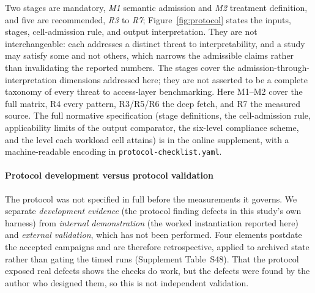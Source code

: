Two stages are mandatory, \emph{M1} semantic admission and \emph{M2} treatment definition, and five are recommended, \emph{R3} to \emph{R7}; Figure~\ref{fig:protocol} states the inputs, stages, cell-admission rule, and output interpretation.
They are not interchangeable: each addresses a distinct threat to interpretability, and a study may satisfy some and not others, which narrows the admissible claims rather than invalidating the reported numbers.
The stages cover the admission-through-interpretation dimensions addressed here; they are not asserted to be a complete taxonomy of every threat to access-layer benchmarking.
Here M1--M2 cover the full matrix, R4 every pattern, R3/R5/R6 the deep fetch, and R7 the measured source.
The full normative specification (stage definitions, the cell-admission rule, applicability limits of the output comparator, the six-level compliance scheme, and the level each workload cell attains) is in the online supplement, with a machine-readable encoding in \texttt{protocol-checklist.yaml}.

\usetikzlibrary{arrows.meta,positioning,fit,shapes.geometric}


\paragraph{Protocol development versus protocol validation} The protocol was not specified in full before the measurements it governs.
We separate \emph{development evidence} (the protocol finding defects in this study's own harness) from \emph{internal demonstration} (the worked instantiation reported here) and \emph{external validation}, which has not been performed.
Four elements postdate the accepted campaigns and are therefore retrospective, applied to archived state rather than gating the timed runs (Supplement Table~S48).
That the protocol exposed real defects shows the checks do work, but the defects were found by the author who designed them, so this is not independent validation.

